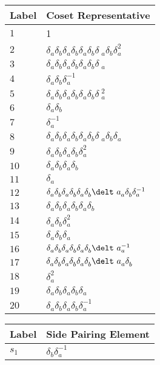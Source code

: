 \documentclass{article}
\begin{document}
\begin{center}
\begin{tabular}{ll}
\toprule
Label & Coset Representative\\
\midrule
$1$ & 1 \\
$2$ & $\delta_a^{}\delta_b^{}\delta_a^{}\delta_b^{}\delta_a^{}\delta_b^{}\delta\
_a^{}\delta_b^{}\delta_a^{2}$ \\
$3$ & $\delta_a^{}\delta_b^{}\delta_a^{}\delta_b^{}\delta_a^{}\delta_b^{}\delta\
_a^{}$ \\
$4$ & $\delta_a^{}\delta_b^{}\delta_a^{-1}$ \\
$5$ & $\delta_a^{}\delta_b^{}\delta_a^{}\delta_b^{}\delta_a^{}\delta_b^{}\delta\
_a^{2}$ \\
$6$ & $\delta_a^{}\delta_b^{}$ \\
$7$ & $\delta_a^{-1}$ \\
$8$ & $\delta_a^{}\delta_b^{}\delta_a^{}\delta_b^{}\delta_a^{}\delta_b^{}\delta\
_a^{}\delta_b^{}\delta_a^{}$ \\
$9$ & $\delta_a^{}\delta_b^{}\delta_a^{}\delta_b^{}\delta_a^{2}$ \\
$10$ & $\delta_a^{}\delta_b^{}\delta_a^{}\delta_b^{}$ \\
$11$ & $\delta_a^{}$ \\
$12$ & $\delta_a^{}\delta_b^{}\delta_a^{}\delta_b^{}\delta_a^{}\delta_b^{}\delt\
a_a^{}\delta_b^{}\delta_a^{-1}$ \\
$13$ & $\delta_a^{}\delta_b^{}\delta_a^{}\delta_b^{}\delta_a^{}\delta_b^{}$ \\
$14$ & $\delta_a^{}\delta_b^{}\delta_a^{2}$ \\
$15$ & $\delta_a^{}\delta_b^{}\delta_a^{}$ \\
$16$ & $\delta_a^{}\delta_b^{}\delta_a^{}\delta_b^{}\delta_a^{}\delta_b^{}\delt\
a_a^{-1}$ \\
$17$ & $\delta_a^{}\delta_b^{}\delta_a^{}\delta_b^{}\delta_a^{}\delta_b^{}\delt\
a_a^{}\delta_b^{}$ \\
$18$ & $\delta_a^{2}$ \\
$19$ & $\delta_a^{}\delta_b^{}\delta_a^{}\delta_b^{}\delta_a^{}$ \\
$20$ & $\delta_a^{}\delta_b^{}\delta_a^{}\delta_b^{}\delta_a^{-1}$ \\
\bottomrule
\end{tabular}
\hfill
\begin{tabular}{ll}
\toprule
Label & Side Pairing Element\\
\midrule
$s_{1}$ & $\delta_b^{}\delta_a^{-1}$ \\

\end{tabular}
\end{center}
\end{document}
